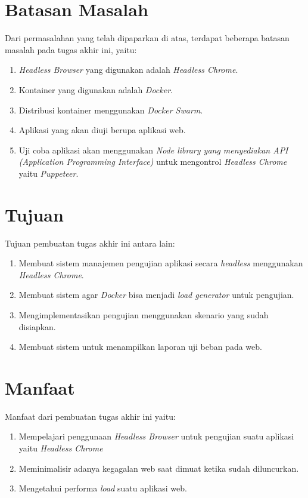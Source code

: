 	\section{Batasan Masalah}
		Dari permasalahan yang telah dipaparkan di atas, terdapat beberapa batasan masalah pada tugas akhir ini, yaitu:
		\begin{enumerate}
			\item \textit{Headless Browser} yang digunakan adalah \textit{Headless Chrome}.
			\item Kontainer yang digunakan adalah \textit{Docker}.
			\item Distribusi kontainer menggunakan \textit{Docker Swarm}.
			\item Aplikasi yang akan diuji berupa aplikasi web.
			\item Uji coba aplikasi akan menggunakan  \textit{Node library yang menyediakan API (Application Programming Interface)} untuk mengontrol \textit{Headless Chrome} yaitu \textit{Puppeteer}.
		\end{enumerate}

	\section{Tujuan}
       	Tujuan pembuatan tugas akhir ini antara lain:
       	\begin{enumerate}
       		\item Membuat sistem manajemen pengujian aplikasi secara \textit{headless} menggunakan \textit{Headless Chrome}.
       		\item Membuat sistem agar \textit{Docker} bisa menjadi \textit{load generator} untuk pengujian.
       		\item Mengimplementasikan pengujian menggunakan skenario yang sudah disiapkan.
       		\item Membuat sistem untuk menampilkan laporan uji beban pada web.
       	\end{enumerate}
        
	\section{Manfaat}
		Manfaat dari pembuatan tugas akhir ini yaitu:
		\begin{enumerate}
			\item Mempelajari penggunaan \textit{Headless Browser} untuk pengujian suatu aplikasi yaitu \textit{Headless Chrome}
			\item Meminimalisir adanya kegagalan web saat dimuat ketika sudah diluncurkan.
			\item Mengetahui performa \textit{load} suatu aplikasi web.
		\end{enumerate}
	
